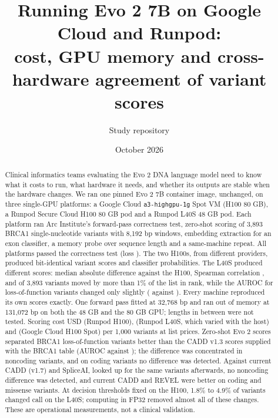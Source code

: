 \documentclass[11pt]{article}
\title{Running Evo 2 7B on Google Cloud and Runpod:\\
cost, GPU memory and cross-hardware agreement of variant scores}
\author{Study repository \code{rewire-bio/evo2-cloud-operations}}
\date{October 2026}
\newcommand{\code}[1]{\texttt{#1}}
\begin{document}
\maketitle

\begin{abstract}
\noindent Clinical informatics teams evaluating the Evo 2 DNA language model need to know what it
costs to run, what hardware it needs, and whether its outputs are stable when the hardware changes.
We ran one pinned Evo 2 7B container image, unchanged, on three single-GPU platforms: a Google Cloud
\code{a3-highgpu-1g} Spot VM (H100 80 GB), a Runpod Secure Cloud H100 80 GB pod and a Runpod L40S
48 GB pod. Each platform ran Arc Institute's forward-pass correctness test, zero-shot scoring of
3,893 BRCA1 single-nucleotide variants with 8,192 bp windows, embedding extraction for an exon
classifier, a memory probe over sequence length and a same-machine repeat. All platforms passed
the correctness test (loss \PTwoLoss). The two H100s, from different providers, produced
bit-identical variant scores and classifier probabilities. The L40S produced different scores:
median absolute difference \PFiveMedianDiff{} against the H100, Spearman correlation \PFiveSpearman,
and \PFiveRankMoves{} of 3,893 variants moved by more than 1\% of the list in rank, while the AUROC
for loss-of-function variants changed only slightly (\PFiveAurocAll{} against \PTwoAurocAll).
Every machine reproduced its own scores exactly. One forward pass fitted at 32,768 bp and ran out of memory
at 131,072 bp on both the 48 GB and the 80 GB GPU; lengths in between were not tested. Scoring cost USD \PThreePerThousand{} (Runpod H100),
\PFivePerThousand{} (Runpod L40S, which varied with the host) and \PTwoPerThousand{} (Google
Cloud H100 Spot) per 1,000 variants at list prices. Zero-shot Evo 2 scores separated BRCA1 loss-of-function variants better
than the CADD v1.3 scores supplied with the BRCA1 table (AUROC \AurocEvoAll{} against
\AurocCaddAll); the difference was concentrated in noncoding variants, and on coding variants no
difference was detected. Against current CADD (v1.7) and SpliceAI, looked up for the same variants
afterwards, no noncoding difference was detected, and current CADD and REVEL were better on coding
and missense variants. At decision thresholds fixed on the H100, 1.8\% to 4.9\% of variants changed
call on the L40S; computing in FP32 removed almost all of these changes. These are operational
measurements, not a clinical validation.
\end{abstract}
\end{document}
